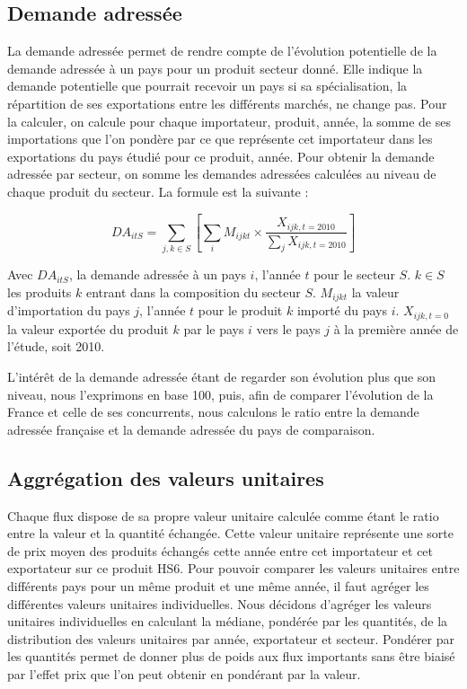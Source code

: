 \documentclass[french,10pt,a4paper]{article}
\begin{document}
\subsection*{Demande adressée}

La demande adressée permet de rendre compte de l'évolution potentielle de la demande adressée à un pays pour un produit secteur donné. Elle indique la demande potentielle que pourrait recevoir un pays si sa spécialisation, la répartition de ses exportations entre les différents marchés, ne change pas. Pour la calculer, on calcule pour chaque importateur, produit, année, la somme de ses importations que l'on pondère par ce que représente cet importateur dans les exportations du pays étudié pour ce produit, année. Pour obtenir la demande adressée par secteur, on somme les demandes adressées calculées au niveau de chaque produit du secteur. La formule est la suivante :

\begin{equation}
\label{eq:1}
DA_{itS} = \sum_{j,k \in S} \left[ \sum_{i} M_{ijkt} \times \frac{X_{ijk,t=2010}}{\sum_{j}X_{ijk,t=2010}}\right]  
\end{equation}

Avec $DA_{itS}$, la demande adressée à un pays $i$, l'année $t$ pour le secteur $S$. $k \in S$ les produits $k$ entrant dans la composition du secteur $S$. $M_{ijkt}$ la valeur d'importation du pays $j$, l'année $t$ pour le produit $k$ importé du pays $i$. $X_{ijk, t=0}$ la valeur exportée du produit $k$ par le pays $i$ vers le pays $j$ à la première année de l'étude, soit 2010.

L'intérêt de la demande adressée étant de regarder son évolution plus que son niveau, nous l'exprimons en base 100, puis, afin de comparer l'évolution de la France et celle de ses concurrents, nous calculons le ratio entre la demande adressée française et la demande adressée du pays de comparaison. 

\subsection*{Aggrégation des valeurs unitaires}

Chaque flux dispose de sa propre valeur unitaire calculée comme étant le ratio entre la valeur et la quantité échangée. Cette valeur unitaire représente une sorte de prix moyen des produits échangés cette année entre cet importateur et cet exportateur sur ce produit HS6. Pour pouvoir comparer les valeurs unitaires entre différents pays pour un même produit et une même année, il faut agréger les différentes valeurs unitaires individuelles. Nous décidons d'agréger les valeurs unitaires individuelles en calculant la médiane, pondérée par les quantités, de la distribution des valeurs unitaires par année, exportateur et secteur. Pondérer par les quantités permet de donner plus de poids aux flux importants sans être biaisé par l'effet prix que l'on peut obtenir en pondérant par la valeur.
\end{document}
